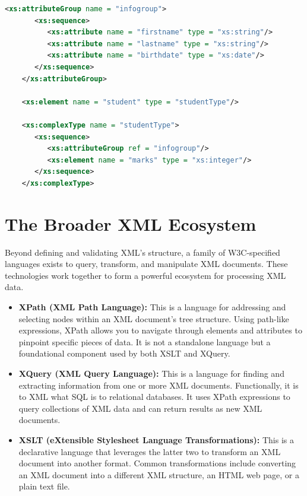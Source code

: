 \documentclass{scrbook}
\begin{document}
\begin{lstlisting}[language=XML, caption=Example of attributes group definition - Courtesy of tutorialspoint.com]
    <xs:attributeGroup name = "infogroup">
       <xs:sequence>
          <xs:attribute name = "firstname" type = "xs:string"/>
          <xs:attribute name = "lastname" type = "xs:string"/>
          <xs:attribute name = "birthdate" type = "xs:date"/>
       </xs:sequence>
    </xs:attributeGroup>
    
    <xs:element name = "student" type = "studentType"/>
    
    <xs:complexType name = "studentType">
       <xs:sequence>
          <xs:attributeGroup ref = "infogroup"/>
          <xs:element name = "marks" type = "xs:integer"/>
       </xs:sequence>
    </xs:complexType>
\end{lstlisting}

\chapter{The Broader XML Ecosystem}

Beyond defining and validating XML's structure, a family of W3C-specified languages exists to query, transform, and manipulate XML documents. These technologies work together to form a powerful ecosystem for processing XML data.

\begin{itemize}
    \item
    \textbf{XPath (XML Path Language):} This is a language for addressing and selecting nodes within an XML document's tree structure. Using path-like expressions, XPath allows you to navigate through elements and attributes to pinpoint specific pieces of data. It is not a standalone language but a foundational component used by both XSLT and XQuery.

    \item 
    \textbf{XQuery (XML Query Language):} This is a language for finding and extracting information from one or more XML documents. Functionally, it is to XML what SQL is to relational databases. It uses XPath expressions to query collections of XML data and can return results as new XML documents.

    \item 
    \textbf{XSLT (eXtensible Stylesheet Language Transformations):} This is a declarative language that leverages the latter two to transform an XML document into another format. Common transformations include converting an XML document into a different XML structure, an HTML web page, or a plain text file.
\end{itemize}
\end{document}
